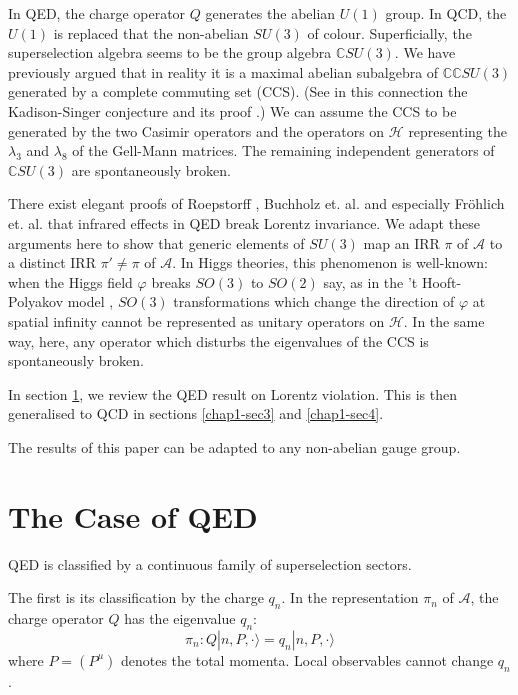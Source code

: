 In QED, the charge operator $Q$ generates the abelian $U(1)$ group. In QCD, the $U(1)$ is replaced that the non-abelian $SU(3)$ of colour. Superficially, the superselection algebra seems to be the group algebra $\mathbb{C}SU(3)$. We have previously argued \cite{key1} that in reality it is a maximal abelian subalgebra of $\mathbb{CC}SU(3)$ generated by a complete commuting set (CCS). (See in this connection the Kadison-Singer conjecture and its proof \cite{key5}.) We can assume the CCS to be generated by the two Casimir operators and the operators on $\mathcal{H}$ representing the $\lambda_{3}$ and $\lambda_{8}$ of the Gell-Mann matrices. The remaining independent generators of $\mathbb{C}SU(3)$ are spontaneously broken.

There exist elegant proofs of Roepstorff \cite{key6}, Buchholz et. al. \cite{key2} and especially Fr\"ohlich et. al. \cite{key3} that infrared effects in QED break Lorentz invariance. We adapt these arguments here to show that generic elements of $SU(3)$ map an IRR $\pi$ of $\mathcal{A}$ to a distinct IRR $\pi'\neq \pi$ of $\mathcal{A}$. In Higgs theories, this phenomenon is well-known: when the Higgs field $\varphi$ breaks $SO(3)$ to $SO(2)$ say, as in the 't Hooft-Polyakov model \cite{key7}, $SO(3)$ transformations which change the direction of $\varphi$ at spatial infinity cannot be represented as unitary operators on $\mathcal{H}$. In the same way, here, any operator which disturbs the eigenvalues of the CCS is spontaneously broken.

In section \ref{chap1-sec2}, we review the QED result on Lorentz violation. This is then generalised to QCD in sections \ref{chap1-sec3} and \ref{chap1-sec4}.

The results of this paper can be adapted to any non-abelian gauge group.

\section{The Case of QED}\label{chap1-sec2}

QED is classified by a continuous family of superselection sectors.

The first is its classification by the charge $q_{n}$. In the representation $\pi_{n}$ of $\mathcal{A}$, the charge operator $Q$ has the eigenvalue $q_{n}$:
\begin{equation}
\pi_{n}: Q|n,P,\cdot \rangle=q_{n}|n,P,\cdot\rangle\label{chap1-eq2.1}
\end{equation}
where $P = (P^{\mu})$ denotes the total momenta. Local observables cannot change $q_{n}$.

